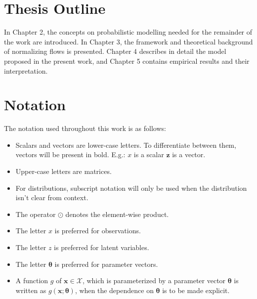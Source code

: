 \section{Thesis Outline}
\label{section:outline}

In Chapter 2, the concepts on probabilistic modelling needed for the remainder
of the work are introduced. In Chapter 3, the framework and theoretical background
of normalizing flows is presented. Chapter 4 describes in detail the model
proposed in the present work, and Chapter 5 contains empirical results and their
interpretation.

\section{Notation}
\label{section:notation}
The notation used throughout this work is as follows:

\begin{itemize}
    \item Scalars and vectors are lower-case letters. To differentiate between
them, vectors will be present in bold. E.g.: $x$ is a scalar $\mathbf{z}$ is
a vector.
    \item Upper-case letters are matrices.
    \item For distributions, subscript notation will only be used when the
distribution isn't clear from context.
    \item The operator $\odot$ denotes the element-wise product.
    \item The letter $x$ is preferred for observations.
    \item The letter $z$ is preferred for latent variables.
    \item The letter $\bm\theta$ is preferred for parameter vectors.
    \item A function $g$ of $\bm{x} \in \bm{\mathcal{X}}$, which is parameterized
    by a parameter vector $\bm\theta$ is written as $g(\bm{x};\bm\theta)$, when
    the dependence on $\bm\theta$ is to be made explicit.
\end{itemize}
